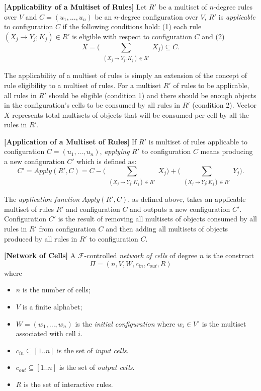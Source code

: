 \documentclass[a4paper]{article}
\theoremstyle{definition}
\newcommand{\ra}{\rightarrow}
\begin{document}
\label{def-appc} \textbf{[Applicability of a Multiset of Rules]} Let $R'$ be a multiset 
of $n$-degree rules over $V$ and $C = (u_1,...,u_n)$ be an $n$-degree configuration over $V$, $R'$ 
is \emph{applicable} to configuration $C$ if the following conditions hold: (1) each rule 
$(X_j \ra Y_j;K_j) \in R'$ is eligible with respect to configuration $C$ and (2) 
$$X = \Bigg(\sum_{\substack{(X_j \ra Y_j; K_j) \in R'}} X_j\Bigg)\subseteq C.$$

The applicability of a multiset of rules is simply an extension of the concept of rule eligibility
to a multiset of rules. For a multiset $R'$ of rules to be applicable, all rules in $R'$ should
be eligible (condition 1) and there should be enough objects in the configuration's cells to be 
consumed by all rules in $R'$ (condition 2). Vector $X$ represents total multisets of objects that 
will be consumed per cell by all the rules in $R'$.


\label{def-appl} \textbf{[Application of a Multiset of Rules]} If $R'$ is multiset of 
rules applicable to configuration $C = (u_1,...,u_n)$, \emph{applying} $R'$ to configuration $C$ 
means producing a new configuration $C'$ which is defined as: 
$$C' = Apply(R',C) =  C - \Bigg(\sum_{\substack{(X_j \ra Y_j; K_j) \in R'}} X_j\Bigg) +
\Bigg(\sum_{\substack{(X_j \ra Y_j; K_j) \in R'}} Y_j\Bigg).$$

The \emph{application function} $Apply(R',C)$, as defined above, takes an applicable multiset of 
rules $R'$ and configuration $C$ and outputs a new configuration $C'$. Configuration $C'$ is the 
result of removing all multisets of objects consumed by all rules in $R'$ from configuration $C$ and 
then adding all multisets of objects produced by all rules in $R'$ to configuration $C$.


\label{def-nc} \textbf{[Network of Cells]} A $\mathscr{F}$-controlled \emph{network of 
cells} of degree $n$ is the construct $$\Pi = (n, V, W, c_{in}, c_{out}, R)$$ where

\begin{multicols}{2}
\begin{itemize}
\item $n$ is the number of cells; 
\item $V$ is a finite alphabet;
\item $W = (w_1,...,w_n)$ is the \emph{initial configuration} where $w_i \in V^{\circ}$ is the
      multiset associated with cell $i$.
\item $c_{in} \subseteq [1..n]$ is the set of \emph{input cells}.
\item $c_{out} \subseteq [1..n]$ is the set of \emph{output cells}.
\item $R$ is the set of interactive rules. 
\end{itemize}
\end{multicols}
\end{document}
